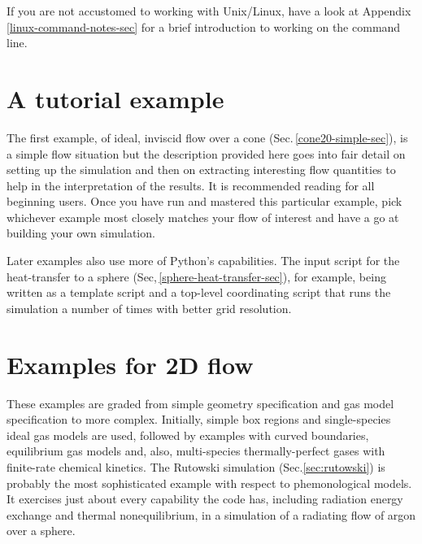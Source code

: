 \documentclass[12pt,a4paper,twoside]{article}
\begin{document}
\medskip
If you are not accustomed to working with Unix/Linux, 
have a look at Appendix\,\ref{linux-command-notes-sec}
for a brief introduction to working on the command line.




 
\cleardoublepage

\part{A tutorial example}
%
The first example, of ideal, inviscid flow over a cone (Sec.\,\ref{cone20-simple-sec}), 
is a simple flow situation but the description provided here goes into fair detail 
on setting up the simulation and then on extracting interesting flow quantities 
to help in the interpretation of the results. 
It is recommended reading for all beginning users.
Once you have run and mastered this particular example, 
pick whichever example most closely matches your flow of interest 
and have a go at building your own simulation.

\medskip
Later examples also use more of Python's capabilities.
The input script for the heat-transfer to a sphere (Sec,\,\ref{sphere-heat-transfer-sec}), 
for example, being written as a template script and a top-level 
coordinating script that runs the simulation a number of times with better grid resolution.


\cleardoublepage


\part{Examples for 2D flow}
%
These examples are graded from simple geometry specification and gas model specification
to more complex.
Initially, simple box regions and single-species ideal gas models are used, followed by
examples with curved boundaries, equilibrium gas models and, also, 
multi-species thermally-perfect gases with finite-rate chemical kinetics.
The Rutowski simulation (Sec.\ref{sec:rutowski}) is probably the most sophisticated example
with respect to phemonological models.
It exercises just about every capability the code has, 
including radiation energy exchange and thermal nonequilibrium,
in a simulation of a radiating flow of argon over a sphere.
\end{document}
